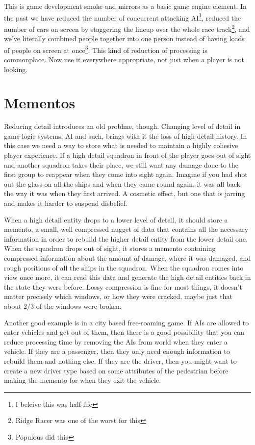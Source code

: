 This is game development smoke and mirrors as a basic game engine element. In
the past we have reduced the number of concurrent attacking AI\footnote{I
beleive this was half-life}, reduced the number of cars on screen by
staggering the lineup over the whole race track\footnote{Ridge Racer was one of
the worst for this}, and we've literally combined people together into one
person instead of having loads of people on screen at once\footnote{Populous
did this}. This kind of reduction of processing is commonplace. Now use it
everywhere appropriate, not just when a player is not looking.

\section{Mementos}

Reducing detail introduces an old problme, though. Changing level of detail in
game logic systems, AI and such, brings with it the loss of high detail
history. In this case we need a way to store what is needed to maintain a
highly cohesive player experience. If a high detail squadron in front of the
player goes out of sight and another squadron takes their place, we still want
any damage done to the first group to reappear when they come into sight again.
Imagine if you had shot out the glass on all the ships and when they came round
again, it was all back the way it was when they first arrived. A cosmetic
effect, but one that is jarring and makes it harder to suspend disbelief.

When a high detail entity drops to a lower level of detail, it should store a
memento, a small, well compressed nugget of data that contains all the
necessary information in order to rebuild the higher detail entity from the
lower detail one. When the squadron drops out of sight, it stores a memento
containing compressed information about the amount of damage, where it was
damaged, and rough positions of all the ships in the squadron. When the
squadron comes into view once more, it can read this data and generate the high
detail entities back in the state they were before. Lossy compression is fine
for most things, it doesn't matter precisely which windows, or how they were
cracked, maybe just that about $2/3$ of the windows were broken.

Another good example is in a city based free-roaming game. If AIs are allowed
to enter vehicles and get out of them, then there is a good possibility that
you can reduce processing time by removing the AIs from world when they enter a
vehicle. If they are a passenger, then they only need enough information to
rebuild them and nothing else. If they are the driver, then you might want to
create a new driver type based on some attributes of the pedestrian before
making the memento for when they exit the vehicle.

